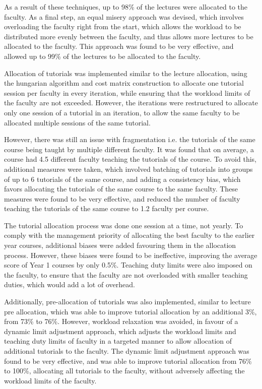As a result of these techniques, up to 98\% of the lectures were allocated to the faculty. As a final step, an equal misery approach was devised, which involves overloading the faculty right from the start, which allows the workload to be distributed more evenly between the faculty, and thus allows more lectures to be allocated to the faculty. This approach was found to be very effective, and allowed up to 99\% of the lectures to be allocated to the faculty.

Allocation of tutorials was implemented similar to the lecture allocation, using the hungarian algorithm and cost matrix construction to allocate one tutorial session per faculty in every iteration, while ensuring that the workload limits of the faculty are not exceeded.  However, the iterations were restructured to allocate only one session of a tutorial in an iteration, to allow the same faculty to be allocated multiple sessions of the same tutorial.

However, there was still an issue with fragmentation i.e. the tutorials of the same course being taught by multiple different faculty. It was found that on average, a course had 4.5 different faculty teaching the tutorials of the course. To avoid this, additional measures were taken, which involved batching of tutorials into groups of up to 6 tutorials of the same course, and adding a consistency bias, which favors allocating the tutorials of the same course to the same faculty. These measures were found to be very effective, and reduced the number of faculty teaching the tutorials of the same course to 1.2 faculty per course.

The tutorial allocation process was done one session at a time, not yearly. To comply with the management priority of allocating the best faculty to the earlier year courses, additional biases were added favouring them in the allocation process. However, these biases were found to be ineffective, improving the average score of Year 1 courses by only 0.5\%. Teaching duty limits were also imposed on the faculty, to ensure that the faculty are not overloaded with smaller teaching duties, which would add a lot of overhead.

Additionally, pre-allocation of tutorials was also implemented, similar to lecture pre allocation, which was able to improve tutorial allocation by an additional 3\%, from 73\% to 76\%. However, workload relaxation was avoided, in favour of a dynamic limit adjustment approach, which adjusts the workload limits and teaching duty limits of faculty in a targeted manner to allow allocation of additional tutorials to the faculty. The dynamic limit adjustment approach was found to be very effective, and was able to improve tutorial allocation from 76\% to 100\%, allocating all tutorials to the faculty, without adversely affecting the workload limits of the faculty.


